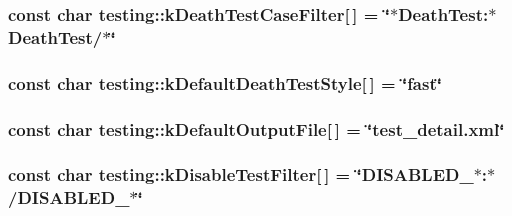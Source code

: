 {\subsubsection[{\texorpdfstring{k\+Death\+Test\+Case\+Filter}{kDeathTestCaseFilter}}]{\setlength{\rightskip}{0pt plus 5cm}const char testing\+::k\+Death\+Test\+Case\+Filter\mbox{[}$\,$\mbox{]} = \char`\"{}$\ast$Death\+Test\+:$\ast$Death\+Test/$\ast$\char`\"{}\hspace{0.3cm}{\ttfamily [static]}}\hypertarget{namespacetesting_a23c33f4bfcc3c2e5e620eff31a98892d}{}\label{namespacetesting_a23c33f4bfcc3c2e5e620eff31a98892d}
\subsubsection[{\texorpdfstring{k\+Default\+Death\+Test\+Style}{kDefaultDeathTestStyle}}]{\setlength{\rightskip}{0pt plus 5cm}const char testing\+::k\+Default\+Death\+Test\+Style\mbox{[}$\,$\mbox{]} = \char`\"{}fast\char`\"{}\hspace{0.3cm}{\ttfamily [static]}}\hypertarget{namespacetesting_a317291240e750e2142a23cbd52bc5aec}{}\label{namespacetesting_a317291240e750e2142a23cbd52bc5aec}
\subsubsection[{\texorpdfstring{k\+Default\+Output\+File}{kDefaultOutputFile}}]{\setlength{\rightskip}{0pt plus 5cm}const char testing\+::k\+Default\+Output\+File\mbox{[}$\,$\mbox{]} = \char`\"{}test\+\_\+detail.\+xml\char`\"{}\hspace{0.3cm}{\ttfamily [static]}}\hypertarget{namespacetesting_aa5a002b5bb3784c830b1c99aa2688f27}{}\label{namespacetesting_aa5a002b5bb3784c830b1c99aa2688f27}
\subsubsection[{\texorpdfstring{k\+Disable\+Test\+Filter}{kDisableTestFilter}}]{\setlength{\rightskip}{0pt plus 5cm}const char testing\+::k\+Disable\+Test\+Filter\mbox{[}$\,$\mbox{]} = \char`\"{}D\+I\+S\+A\+B\+L\+E\+D\+\_\+$\ast$\+:$\ast$/D\+I\+S\+A\+B\+L\+E\+D\+\_\+$\ast$\char`\"{}\hspace{0.3cm}{\ttfamily [static]}}\hypertarget{namespacetesting_a0a2a3239fb038e7ce83195d89941872d}{}\label{namespacetesting_a0a2a3239fb038e7ce83195d89941872d}
}
